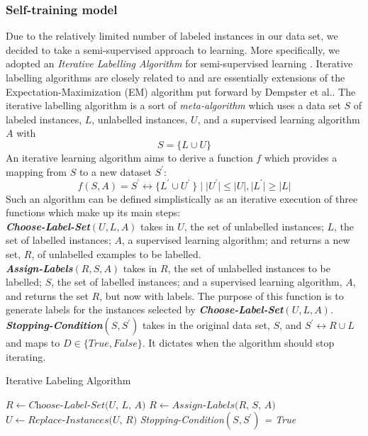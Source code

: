 \documentclass[10pt,letterpaper]{article}
\begin{document}
\subsubsection{Self-training model} \label{learning}
Due to the relatively limited number of labeled instances in our data set, we decided to take a semi-supervised approach to learning. More specifically, we adopted an \textit{Iterative Labelling Algorithm} for semi-supervised learning \cite{REF22}. Iterative labelling algorithms are closely related to and are essentially extensions of the Expectation-Maximization (EM) algorithm put forward by Dempster et al.\cite{REF20}. The iterative labelling algorithm is a sort of \textit{meta-algorithm} which uses a data set $S$ of labeled instances, $L$, unlabelled instances, $U$, and a supervised learning algorithm $A$ with 
\[
S = \{L \cup U\}
\]
An iterative learning algorithm aims to derive a function $f$ which provides a mapping from $S$ to a new dataset $S^\prime$:
\begin{displaymath}
f(S, A) = S^\prime \leftrightarrow \{L^\prime \cup U^\prime\ \} \;|\; |U^\prime| \leq |U|, |L^\prime| \geq |L|
\end{displaymath} 
Such an algorithm can be defined simplistically as an iterative execution of three functions which make up its main steps: \\
%
\textbf{\textit{Choose-Label-Set$(U, L, A)$}} takes in $U$, the set of unlabelled instances; $L$, the set of labelled instances; $A$, a supervised learning algorithm; and returns a new set, $R$, of unlabelled examples to be labelled.\\ 
\textbf{\textit{Assign-Labels$(R, S, A)$}} takes in $R$, the set of unlabelled instances to be labelled;  $S$, the set of labelled instances; and a supervised learning algorithm, $A$, and returns the set $R$, but now with labels. The purpose of this function is to generate labels for the instances selected by \textbf{\textit{Choose-Label-Set$(U, L, A)$}}.\\
\textbf{\textit{Stopping-Condition$(S, S^\prime)$}} takes in the original data set, $S$, and $S^\prime \leftrightarrow R \cup L$ and maps to $D \in \{True, False\}$. It dictates when the algorithm should stop iterating.\\
%
\begin{algorithm}[h!]
\caption{Iterative Labeling Algorithm} \label{alg:algo}
\begin{algorithmic}[1]
\Repeat
\State $R \gets \textit{Choose-Label-Set(U, L, A)}$
\State $R \gets \textit{Assign-Labels(R, S, A)}$
\State $U \gets \textit{Replace-Instances(U, R)}$
\Until \textit{Stopping-Condition$(S, S^\prime)$ = True}
\EndFunction
\end{algorithmic}
\end{algorithm}
%
\end{document}
